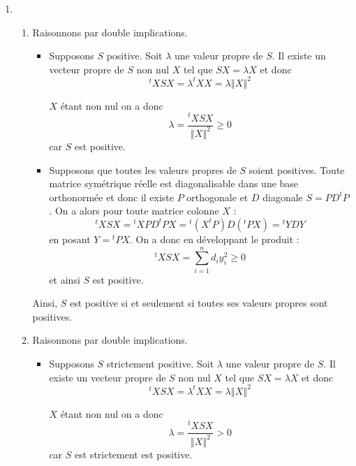 \documentclass[a4paper,twoside,french,11pt]{VcCours}
\begin{document}
\begin{enumerate}
\item 
\begin{enumerate}
\item Raisonnons par double implications.

\begin{itemize}
\item Supposons $S$ positive. Soit $\lambda $ une valeur propre de $S$. Il existe un vecteur propre de $S$ non nul $X$ tel que $SX=\lambda X$ et donc 
\[
^{t}XSX=\lambda ^{t}XX=\lambda \left\Vert X\right\Vert ^{2}
\]

$X$ étant non nul on a donc 
\[
\lambda =\frac{^{t}XSX}{\left\Vert X\right\Vert ^{2}} \geq 0
\]
car $S$ est positive.

\item Supposons que toutes les valeurs propres de $S$ soient positives. Toute matrice symétrique réelle est diagonalisable dans une base orthonormée et donc il existe $P$ orthogonale et $D$ diagonale $S=PD^{t}P$. On a alors pour toute matrice colonne $X$ :
$$^{t}XSX={}^{t}XPD^{t}PX={}^{t}\left( X^{t}P\right) D(^{t}PX)={}^{t}YDY$$
en posant $Y={}^{t}PX$. On a donc en développant le produit :
$$^{t}XSX= \sum_{i=1}^{n}d_{i}y_{i}^{2} \geq 0$$
et ainsi $S$ est positive.
\end{itemize}
Ainsi, $S$ est positive si et seulement si toutes ses valeurs propres sont positives.
\item  Raisonnons par double implications.

\begin{itemize}
\item Supposons $S$ strictement positive. Soit $\lambda $ une valeur propre de $S$. Il existe un vecteur propre de $S$ non nul $X$ tel que $SX=\lambda X$ et donc 
\[
^{t}XSX=\lambda ^{t}XX=\lambda \left\Vert X\right\Vert ^{2}
\]

$X$ étant non nul on a donc 
\[
\lambda =\frac{^{t}XSX}{\left\Vert X\right\Vert ^{2}} > 0
\]
car $S$ est strictement est positive.


\end{itemize}
\end{enumerate}
\end{enumerate}
\end{document}
